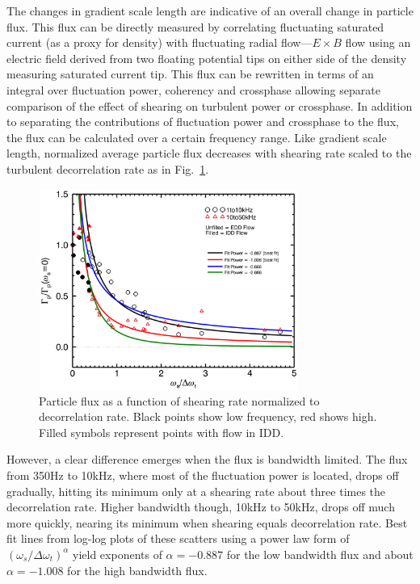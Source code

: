 \documentclass[%
 aps,
 prl,
 amsmath,amssymb,
 reprint,%
]{revtex4-1}
\begin{document}
The changes in gradient scale length are indicative of an overall change in particle flux. This flux can be directly measured by correlating fluctuating saturated current (as a proxy for density) with fluctuating radial flow---$E \times B$ flow using an electric field derived from two floating potential tips on either side of the density measuring saturated current tip. This flux can be rewritten in terms of an integral over fluctuation power, coherency and crossphase allowing separate comparison of the effect of shearing on turbulent power or crossphase. In addition to separating the contributions of fluctuation power and crossphase to the flux, the flux can be calculated over a certain frequency range. Like gradient scale length, normalized average particle flux decreases with shearing rate scaled to the turbulent decorrelation rate as in 
Fig.~\ref{fig:fluxvsshear}. 
\begin{figure}
\begin{center}
\includegraphics[width=8.5cm]{fluxvsshear.pdf}%
\end{center}
\caption{\label{fig:fluxvsshear} Particle flux as a function of shearing rate normalized to decorrelation rate. Black points show low frequency, red shows high. Filled symbols represent points with flow in IDD.}
\end{figure}
However, a clear difference emerges when the flux is bandwidth limited. The flux from 350Hz to 10kHz, where most of the fluctuation power is located, drops off gradually, hitting its minimum only at a shearing rate about three times the decorrelation rate. Higher bandwidth though, 10kHz to 50kHz, drops off much more quickly, nearing its minimum when shearing equals decorrelation rate. Best fit lines from log-log plots of these scatters using a power law form of $\left(\omega_{s}/\Delta \omega_{t}\right)^{\alpha}$ yield exponents of $\alpha = -0.887$ for the low bandwidth flux and about $\alpha = -1.008$ for the high bandwidth flux. 
\end{document}
